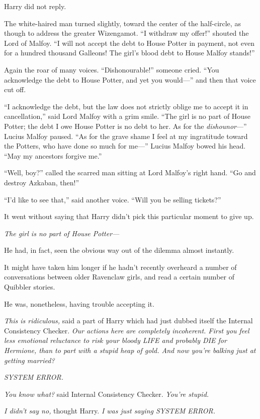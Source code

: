 Harry did not reply.

The white-haired man turned slightly, toward the center of the
half-circle, as though to address the greater Wizengamot. ``I withdraw
my offer!'' shouted the Lord of Malfoy. ``I will not accept the debt to
House Potter in payment, not even for a hundred thousand Galleons! The
girl's blood debt to House Malfoy stands!''

Again the roar of many voices. ``Dishonourable!'' someone cried. ``You
acknowledge the debt to House Potter, and yet you would---'' and then
that voice cut off.

``I acknowledge the debt, but the law does not strictly oblige me to
accept it in cancellation,'' said Lord Malfoy with a grim smile. ``The
girl is no part of House Potter; the debt I owe House Potter is no debt
to her. As for the \emph{dishounor}---'' Lucius Malfoy paused. ``As for
the grave shame I feel at my ingratitude toward the Potters, who have
done so much for me---'' Lucius Malfoy bowed his head. ``May my
ancestors forgive me.''

``Well, boy?'' called the scarred man sitting at Lord Malfoy's right
hand. ``Go and destroy Azkaban, then!''

``I'd like to see that,'' said another voice. ``Will you be selling
tickets?''

It went without saying that Harry didn't pick this particular moment to
give up.

\emph{The girl is no part of House Potter---}

He had, in fact, seen the obvious way out of the dilemma almost
instantly.

It might have taken him longer if he hadn't recently overheard a number
of conversations between older Ravenclaw girls, and read a certain
number of Quibbler stories.

He was, nonetheless, having trouble accepting it.

\emph{This is ridiculous,} said a part of Harry which had just dubbed
itself the Internal Consistency Checker. \emph{Our actions here are
completely incoherent. First you feel less emotional reluctance to risk
your bloody LIFE and probably DIE for Hermione, than to part with a
stupid heap of gold. And now you're balking just at getting married?}

\emph{SYSTEM ERROR.}

\emph{You know what?} said Internal Consistency Checker. \emph{You're
stupid.}

\emph{I didn't say no,} thought Harry. \emph{I was just saying SYSTEM
ERROR.}

